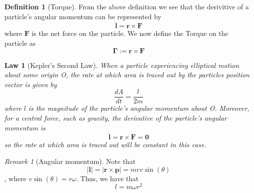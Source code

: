 \documentclass[12pt]{article}
\newtheorem{law}[thm]{Law}
\theoremstyle{definition}
\newtheorem{defn}[thm]{Definition}
\theoremstyle{remark}
\newtheorem{rmk}[thm]{Remark}
\numberwithin{equation}{section}
\newcommand\B[1]{\textbf{#1}}
\begin{document}
\vspace{15pt}

\begin{defn}[Torque]
        From the above definition we see that the derivitive of a particle's angular momentum can be represented by \begin{equation}
                \dot{\B{l}} = \B{r}\times \B{F}
        \end{equation}
        where $\B{F}$ is the net force on the particle. We now define the Torque on the particle as \begin{equation}
                \boldsymbol{\Gamma} := \B{r}\times \B{F}
        \end{equation}
\end{defn}

\vspace{15pt}

\begin{law}[Kepler's Second Law]
        When a particle experiencing elliptical motion about some origin \emph{O}, the rate at which area is traced out by the particles position vector is given by \begin{equation}
                \frac{dA}{dt} = \frac{l}{2m}
        \end{equation}
        where $l$ is the magnitude of the particle's angular momentum about \emph{O}. Moreover, for a central force, such as gravity, the derivative of the particle's angular momentum is \begin{equation}
                \dot{\B{l}} = \B{r}\times\B{F} = \B{0}
        \end{equation}
        so the rate at which area is traced out will be constant in this case.
\end{law}

\vspace{15pt}

\begin{rmk}[Angular momentum]
        Note that $$|\B{l}| = |\B{r}\times\B{p}| = mrv\sin(\theta)$$, where $v\sin(\theta) = r\omega$. Thus, we have that \begin{equation}
                l = m\omega r^2
        \end{equation}
\end{rmk}

\vspace{15pt}
\end{document}
